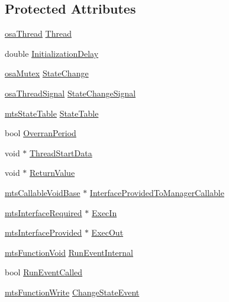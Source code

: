 \subsection*{Protected Attributes}
\begin{DoxyCompactItemize}
\item 
\hyperlink{classosa_thread}{osa\-Thread} \hyperlink{classmts_task_a020aaf3f85e33991c3b349138b826218}{Thread}
\item 
double \hyperlink{classmts_task_a019723804fb78a9c8a2146d921290570}{Initialization\-Delay}
\item 
\hyperlink{classosa_mutex}{osa\-Mutex} \hyperlink{classmts_task_abcc895b6d73ea813783da11440e2fe3a}{State\-Change}
\item 
\hyperlink{classosa_thread_signal}{osa\-Thread\-Signal} \hyperlink{classmts_task_a49ee515de5a8a49d2c307ed429ce390f}{State\-Change\-Signal}
\item 
\hyperlink{classmts_state_table}{mts\-State\-Table} \hyperlink{classmts_task_afef3935273a3dfe792b7d3beb6b3c4f1}{State\-Table}
\item 
bool \hyperlink{classmts_task_a974896a778a02b8928397213658b1c83}{Overran\-Period}
\item 
void $\ast$ \hyperlink{classmts_task_a0f4d0bdac8ce91bd7a44a80d0903165b}{Thread\-Start\-Data}
\item 
void $\ast$ \hyperlink{classmts_task_a78bef07d3d9f446ee5d83724ada03d7e}{Return\-Value}
\item 
\hyperlink{classmts_callable_void_base}{mts\-Callable\-Void\-Base} $\ast$ \hyperlink{classmts_task_a044e5d67f206af2df17d7406860d4ec4}{Interface\-Provided\-To\-Manager\-Callable}
\item 
\hyperlink{classmts_interface_required}{mts\-Interface\-Required} $\ast$ \hyperlink{classmts_task_af77b19432b3640be7680c03cd0f78c22}{Exec\-In}
\item 
\hyperlink{classmts_interface_provided}{mts\-Interface\-Provided} $\ast$ \hyperlink{classmts_task_a5a65f2162a178087dc90effe7a9ab6d8}{Exec\-Out}
\item 
\hyperlink{classmts_function_void}{mts\-Function\-Void} \hyperlink{classmts_task_a8c40d935488c3bdba29f88bef9ee7809}{Run\-Event\-Internal}
\item 
bool \hyperlink{classmts_task_a274a28efd0acb799f30a25ca6a729956}{Run\-Event\-Called}
\item 
\hyperlink{classmts_function_write}{mts\-Function\-Write} \hyperlink{classmts_task_ae7a10d8ab52bae5e6a5dc9589a7a386e}{Change\-State\-Event}
\end{DoxyCompactItemize}
